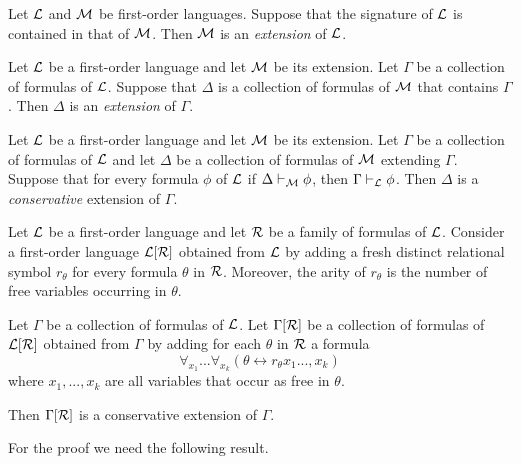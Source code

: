 \documentclass[10pt]{amsart}
\begin{document}
\begin{definition}
	Let ${\mathcal L}$ and ${\mathcal M}$ be first-order languages. Suppose that the signature of ${\mathcal L}$ is contained in that of ${\mathcal M}$. Then ${\mathcal M}$ is an \textit{extension} of ${\mathcal L}$.
\end{definition}

\begin{definition}
	Let ${\mathcal L}$ be a first-order language and let ${\mathcal M}$ be its extension. Let $\Gamma$ be a collection of formulas of ${\mathcal L}$. Suppose that $\Delta$ is a collection of formulas of ${\mathcal M}$ that contains $\Gamma$. Then $\Delta$ is an \textit{extension} of $\Gamma$.
\end{definition}

\begin{definition}
	Let ${\mathcal L}$ be a first-order language and let ${\mathcal M}$ be its extension. Let $\Gamma$ be a collection of formulas of ${\mathcal L}$ and let $\Delta$ be a collection of formulas of ${\mathcal M}$ extending $\Gamma$. Suppose that for every formula $\phi$ of ${\mathcal L}$ if $\Delta \vdash_{{\mathcal M}} \phi$, then $\Gamma \vdash_{{\mathcal L}} \phi$. Then $\Delta$ is a \textit{conservative} extension of $\Gamma$.
\end{definition}
\noindent

\begin{theorem}\label{theorem:extension_by_relational_symbols_is_conserative}
  Let ${\mathcal L}$ be a first-order language and let ${\mathcal R}$ be a family of formulas of ${\mathcal L}$. Consider a first-order language ${\mathcal L}[{\mathcal R}]$ obtained from ${\mathcal L}$ by adding a fresh distinct relational symbol $r_{\theta}$ for every formula $\theta$ in ${\mathcal R}$. Moreover, the arity of $r_{\theta}$ is the number of free variables occurring in $\theta$.

  Let $\Gamma$ be a collection of formulas of ${\mathcal L}$. Let $\Gamma[{\mathcal R}]$ be a collection of formulas of ${\mathcal L}[{\mathcal R}]$ obtained from $\Gamma$ by adding for each $\theta$ in ${\mathcal R}$ a formula
  $$\forall_{x_1}...\forall_{x_k}\left(\theta \leftrightarrow r_{\theta}x_1...,x_k\right)$$
  where $x_1,...,x_k$ are all variables that occur as free in $\theta$.

  Then $\Gamma[{\mathcal R}]$ is a conservative extension of $\Gamma$.
\end{theorem}
\noindent
For the proof we need the following result.
\end{document}
